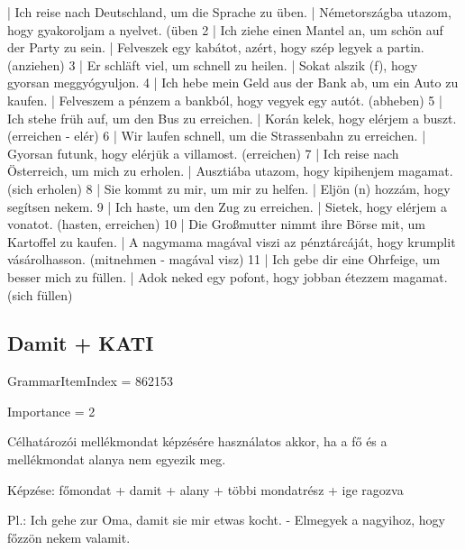 \documentclass{article}
\newenvironment{desc}{\verbatim}{\endverbatim}
\newenvironment{exmp}{\verbatim}{\endverbatim}
\begin{document}
\begin{exmp}
1 | Ich reise nach Deutschland, um die Sprache zu üben. | Németországba utazom, hogy gyakoroljam a nyelvet. (üben
2 | Ich ziehe einen Mantel an, um schön auf der Party zu sein. | Felveszek egy kabátot, azért, hogy szép legyek a partin. (anziehen)
3 | Er schläft viel, um schnell zu heilen. | Sokat alszik (f), hogy gyorsan meggyógyuljon.
4 | Ich hebe mein Geld aus der Bank ab, um ein Auto zu kaufen. | Felveszem a pénzem a bankból, hogy vegyek egy autót. (abheben)
5 | Ich stehe früh auf, um den Bus zu erreichen. | Korán kelek, hogy elérjem a buszt. (erreichen - elér)
6 | Wir laufen schnell, um die Strassenbahn zu erreichen. | Gyorsan futunk, hogy elérjük a villamost. (erreichen)
7 | Ich reise nach Österreich, um mich zu erholen. | Ausztiába utazom, hogy kipihenjem magamat. (sich erholen)
8 | Sie kommt zu mir, um mir zu helfen. | Eljön (n) hozzám, hogy segítsen nekem.
9 | Ich haste, um den Zug zu erreichen. | Sietek, hogy elérjem a vonatot. (hasten, erreichen)
10 | Die Großmutter nimmt ihre Börse mit, um Kartoffel zu kaufen. | A nagymama magával viszi az pénztárcáját, hogy krumplit vásárolhasson. (mitnehmen - magával visz)
11 | Ich gebe dir eine Ohrfeige, um besser mich zu füllen. | Adok neked egy pofont, hogy jobban étezzem magamat. (sich füllen)
\end{exmp}

\subsection{Damit + KATI}

GrammarItemIndex = 862153

Importance = 2

\begin{desc}
Célhatározói mellékmondat képzésére használatos akkor, ha a fő és a mellékmondat alanya nem egyezik meg.

Képzése:
főmondat + damit + alany + többi mondatrész + ige ragozva

Pl.: Ich gehe zur Oma, damit sie mir etwas kocht. - Elmegyek a nagyihoz, hogy főzzön nekem valamit.
\end{desc}
\end{document}
